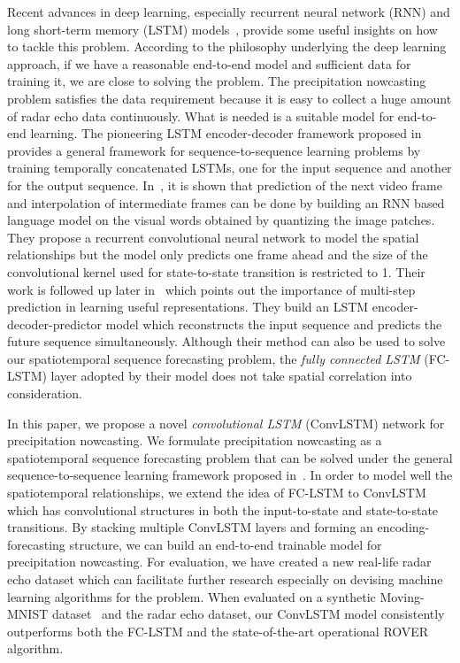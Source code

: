 \documentclass{article} \usepackage{amsmath}
\begin{document}
Recent advances in deep learning, especially recurrent neural network (RNN) and long short-term memory (LSTM) models~\cite{hochreiter1997long, graves2013generating,cho2014learning,donahue2014long,sutskever2014sequence,karpathy2014deep,DBLP:journals/corr/RanzatoSBMCC14,srivastava2015unsupervised,xu2015show}, provide some useful insights on how to tackle this problem.  According to the philosophy underlying the deep learning approach, if we have a reasonable end-to-end model and sufficient data for training it, we are close to solving the problem.  The precipitation nowcasting problem satisfies the data requirement because it is easy to collect a huge amount of radar echo data continuously.  What is needed is a suitable model for end-to-end learning. The pioneering LSTM encoder-decoder framework proposed in~\cite{sutskever2014sequence} provides a general framework for sequence-to-sequence learning problems by training temporally concatenated LSTMs, one for the input sequence and another for the output sequence.  In~\cite{DBLP:journals/corr/RanzatoSBMCC14}, it is shown that prediction of the next video frame and interpolation of intermediate frames can be done by building an RNN based language model on the visual words obtained by quantizing the image patches.  They propose a recurrent convolutional neural network to model the spatial relationships but the model only predicts one frame ahead and the size of the convolutional kernel used for state-to-state transition is restricted to 1.  Their work is followed up later in~\cite{srivastava2015unsupervised} which points out the importance of multi-step prediction in learning useful representations. They build an LSTM encoder-decoder-predictor model which reconstructs the input sequence and predicts the future sequence simultaneously. Although their method can also be used to solve our spatiotemporal sequence forecasting problem, the \emph{fully connected LSTM} (FC-LSTM) layer adopted by their model does not take spatial correlation into consideration.

In this paper, we propose a novel \emph{convolutional LSTM} (ConvLSTM) network for precipitation nowcasting. We formulate precipitation nowcasting as a spatiotemporal sequence forecasting problem that can be solved under the general sequence-to-sequence learning framework proposed in~\cite{sutskever2014sequence}. In order to model well the spatiotemporal relationships, we extend the idea of FC-LSTM to \mbox{ConvLSTM} which has convolutional structures in both the input-to-state and state-to-state transitions. By stacking multiple ConvLSTM layers and forming an encoding-forecasting structure, we can build an end-to-end trainable model for precipitation nowcasting.  For evaluation, we have created a new real-life radar echo dataset which can facilitate further research especially on devising machine learning algorithms for the problem.  When evaluated on a synthetic Moving-MNIST dataset~\cite{srivastava2015unsupervised} and the radar echo dataset, our ConvLSTM model consistently outperforms both the FC-LSTM and the state-of-the-art operational ROVER algorithm.
\end{document}
